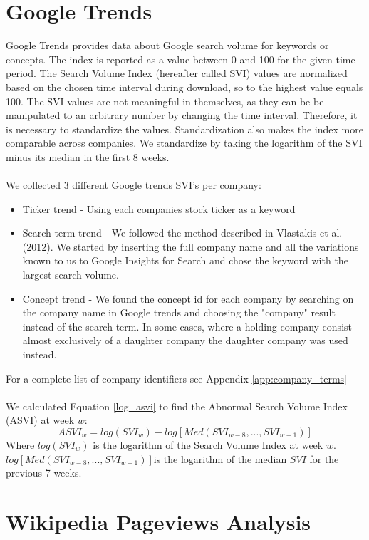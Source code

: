 \section{Google Trends}
Google Trends provides data about Google search volume for keywords or concepts. The index is reported as a value between 0 and 100 for the given time period. The Search Volume Index (hereafter called SVI) values are normalized based on the chosen time interval during download, so to the highest value equals 100. The SVI values are not meaningful in themselves, as they can be be manipulated to an arbitrary number by changing the time interval. Therefore, it is necessary to standardize the values. Standardization also makes the index more comparable across companies. We standardize by taking the logarithm of the SVI minus its median in the first 8 weeks. 
\\\\
We collected 3 different Google trends SVI's per company:
\begin{itemize}
\item Ticker trend - Using each companies stock ticker as a keyword
\item Search term trend - We followed the method described in Vlastakis et al. (2012). We started by inserting the full company name and all the variations known to us to Google Insights for Search and chose the keyword with the largest search volume.
\item Concept trend - We found the concept id for each company by searching on the company name in Google trends and choosing the "company" result instead of the search term. In some cases, where a holding company consist almost exclusively of a daughter company the daughter company was used instead.
\end{itemize}
For a complete list of company identifiers see Appendix \ref{app:company_terms}
\\\\
We calculated Equation \eqref{log_asvi} to find the Abnormal Search Volume Index (ASVI) at week $w$:
\begin{equation}
   \label{log_asvi} 
   ASVI_{w} = log(SVI_{w}) - log[Med(SVI_{w-8},...,SVI_{w-1})] 
\end{equation}
Where $log(SVI_{w})$ is the logarithm of the Search Volume Index at week $w$. $log[Med(SVI_{w-8},...,SVI_{w-1})]$is the logarithm of the median $SVI$ for the previous 7 weeks.

\section{Wikipedia Pageviews Analysis}

